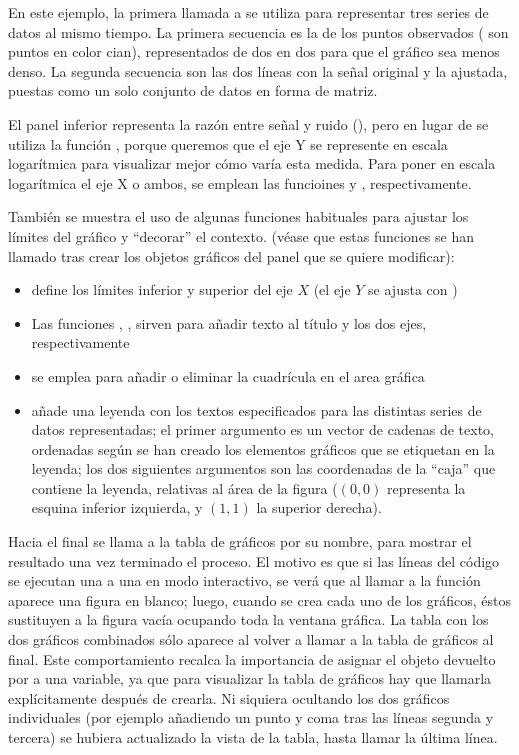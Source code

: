 ﻿\documentclass[spanish]{article}
\begin{document}
En este ejemplo, la primera llamada a  se utiliza para representar tres series de datos al mismo tiempo. La primera secuencia es la de los puntos observados ( son puntos en color cian), representados de dos en dos para que el gráfico sea menos denso. La segunda secuencia son las dos líneas con la señal original y la ajustada, puestas como un solo conjunto de datos en forma de matriz.

El panel inferior representa la razón entre señal y ruido (), pero en lugar de  se utiliza la función , porque queremos que el eje Y se represente en escala logarítmica para visualizar mejor cómo varía esta medida. Para poner en escala logarítmica el eje X o ambos, se emplean las funcioines  y , respectivamente.

También se muestra el uso de algunas funciones habituales para ajustar los límites del gráfico y ``decorar'' el contexto. (véase que estas funciones se han llamado tras crear los objetos gráficos del panel que se quiere modificar):


\begin{itemize}
  \item {} define los límites inferior y superior del eje $X$ (el eje $Y$ se ajusta con )
  \item Las funciones , ,  sirven para añadir texto al título y los dos ejes, respectivamente
  \item {} se emplea para añadir o eliminar la cuadrícula en el area gráfica
  \item {} añade una leyenda con los textos especificados para las distintas series de datos representadas; el primer argumento es un vector de cadenas de texto, ordenadas según se han creado los elementos gráficos que se etiquetan en la leyenda; los dos siguientes argumentos son las coordenadas de la ``caja'' que contiene la leyenda, relativas al área de la figura ($(0,0)$ representa la esquina inferior izquierda, y $(1,1)$ la superior derecha).
\end{itemize}

Hacia el final se llama a la tabla de gráficos por su nombre, para mostrar el resultado una vez terminado el proceso. El motivo es que si las líneas del código se ejecutan una a una en modo interactivo, se verá que al llamar a la función  aparece una figura en blanco; luego, cuando se crea cada uno de los gráficos, éstos sustituyen a la figura vacía ocupando toda la ventana gráfica. La tabla con los dos gráficos combinados sólo aparece al volver a llamar a la tabla de gráficos al final. Este comportamiento recalca la importancia de asignar el objeto devuelto por  a una variable, ya que para visualizar la tabla de gráficos hay que llamarla explícitamente después de crearla. Ni siquiera ocultando los dos gráficos individuales (por ejemplo añadiendo un punto y coma tras las líneas segunda y tercera) se hubiera actualizado la vista de la tabla, hasta llamar la última línea.
\end{document}
